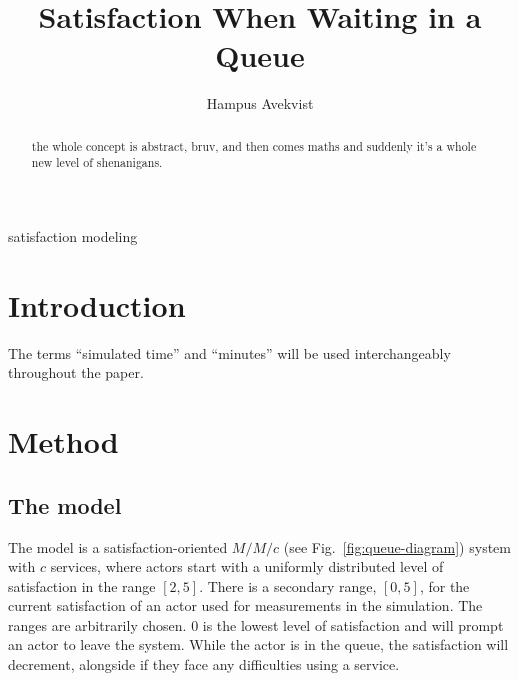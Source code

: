 \documentclass[conference]{IEEEtran}
\begin{document}
\title{Satisfaction When Waiting in a Queue}

\author{
    Hampus Avekvist \\
}

\maketitle

\begin{abstract}
    the whole concept is abstract, bruv, and then comes maths
    and suddenly it's a whole new level of shenanigans.
\end{abstract}

\begin{IEEEkeywords}
    satisfaction modeling
\end{IEEEkeywords}

\section{Introduction}

The terms ``simulated time'' and ``minutes'' will be used
interchangeably throughout the paper.

\section{Method}

\subsection{The model}

The model is a satisfaction-oriented $M/M/c$ \cite{Citation maybe?}
(see Fig.~\ref{fig:queue-diagram}) system with $c$ services, where
actors start with a uniformly distributed level of satisfaction
in the range $[2, 5]$. There is a secondary range, $[0, 5]$, for
the current satisfaction of an actor used for measurements in the
simulation. The ranges are arbitrarily chosen. $0$ is the lowest
level of satisfaction and will prompt an actor to leave the system.
While the actor is in the queue, the satisfaction will decrement,
alongside if they face any difficulties using a service. 
\end{document}
